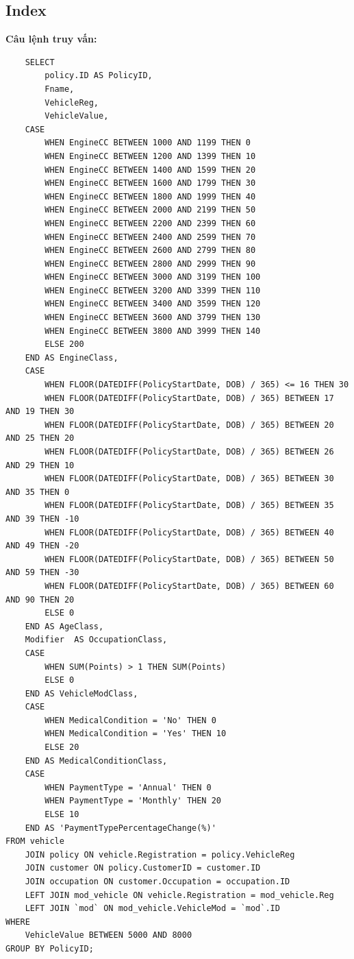 \documentclass[12pt,a4paper]{report}
\begin{document}
\subsection{Index}
	{\bf Câu lệnh truy vấn:}
	\begin{lstlisting}
	SELECT
		policy.ID AS PolicyID,
		Fname,
		VehicleReg,
		VehicleValue,
	CASE
		WHEN EngineCC BETWEEN 1000 AND 1199 THEN 0
		WHEN EngineCC BETWEEN 1200 AND 1399 THEN 10
		WHEN EngineCC BETWEEN 1400 AND 1599 THEN 20
		WHEN EngineCC BETWEEN 1600 AND 1799 THEN 30
		WHEN EngineCC BETWEEN 1800 AND 1999 THEN 40
		WHEN EngineCC BETWEEN 2000 AND 2199 THEN 50
		WHEN EngineCC BETWEEN 2200 AND 2399 THEN 60
		WHEN EngineCC BETWEEN 2400 AND 2599 THEN 70
		WHEN EngineCC BETWEEN 2600 AND 2799 THEN 80
		WHEN EngineCC BETWEEN 2800 AND 2999 THEN 90
		WHEN EngineCC BETWEEN 3000 AND 3199 THEN 100
		WHEN EngineCC BETWEEN 3200 AND 3399 THEN 110
		WHEN EngineCC BETWEEN 3400 AND 3599 THEN 120
		WHEN EngineCC BETWEEN 3600 AND 3799 THEN 130
		WHEN EngineCC BETWEEN 3800 AND 3999 THEN 140
		ELSE 200
	END AS EngineClass,
	CASE
		WHEN FLOOR(DATEDIFF(PolicyStartDate, DOB) / 365) <= 16 THEN 30
		WHEN FLOOR(DATEDIFF(PolicyStartDate, DOB) / 365) BETWEEN 17 AND 19 THEN 30
		WHEN FLOOR(DATEDIFF(PolicyStartDate, DOB) / 365) BETWEEN 20 AND 25 THEN 20
		WHEN FLOOR(DATEDIFF(PolicyStartDate, DOB) / 365) BETWEEN 26 AND 29 THEN 10
		WHEN FLOOR(DATEDIFF(PolicyStartDate, DOB) / 365) BETWEEN 30 AND 35 THEN 0
		WHEN FLOOR(DATEDIFF(PolicyStartDate, DOB) / 365) BETWEEN 35 AND 39 THEN -10
		WHEN FLOOR(DATEDIFF(PolicyStartDate, DOB) / 365) BETWEEN 40 AND 49 THEN -20
		WHEN FLOOR(DATEDIFF(PolicyStartDate, DOB) / 365) BETWEEN 50 AND 59 THEN -30
		WHEN FLOOR(DATEDIFF(PolicyStartDate, DOB) / 365) BETWEEN 60 AND 90 THEN 20
		ELSE 0
	END AS AgeClass,
	Modifier  AS OccupationClass,
	CASE
		WHEN SUM(Points) > 1 THEN SUM(Points)
		ELSE 0
	END AS VehicleModClass,
	CASE
		WHEN MedicalCondition = 'No' THEN 0
		WHEN MedicalCondition = 'Yes' THEN 10
		ELSE 20
	END AS MedicalConditionClass,
	CASE
		WHEN PaymentType = 'Annual' THEN 0
		WHEN PaymentType = 'Monthly' THEN 20
		ELSE 10
	END AS 'PaymentTypePercentageChange(%)'
FROM vehicle
	JOIN policy ON vehicle.Registration = policy.VehicleReg
	JOIN customer ON policy.CustomerID = customer.ID
	JOIN occupation ON customer.Occupation = occupation.ID
	LEFT JOIN mod_vehicle ON vehicle.Registration = mod_vehicle.Reg
	LEFT JOIN `mod` ON mod_vehicle.VehicleMod = `mod`.ID
WHERE
	VehicleValue BETWEEN 5000 AND 8000
GROUP BY PolicyID;
	\end{lstlisting}
	
\end{document}
